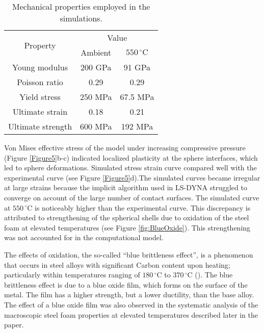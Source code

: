 \documentclass[review]{elsarticle}
\begin{document}
{%
\begin{table}[htbp]
	\centering
	\caption{Mechanical properties employed in the simulations.}
	\begin{tabular}{ccc}
		\toprule
		\multirow{2}[0]{*}{Property} & \multicolumn{2}{c}{Value} \\
		& Ambient & $550\,^{\circ}\mathrm{C}$ \\
		\midrule
		Young modulus & 200 GPa & 91 GPa \\
		Poisson ratio & 0.29  & 0.29 \\
		Yield stress & 250 MPa & 67.5 MPa \\
		Ultimate strain & 0.18  & 0.21 \\
		Ultimate strength & 600 MPa & 192 MPa \\
		\bottomrule
	\end{tabular}%
	\label{Tab2}%
\end{table}%

Von Mises effective stress of the model under increasing compressive pressure (Figure \ref{Figure5}b-c) indicated localized plasticity at the sphere interfaces, which led to sphere deformations. Simulated stress strain curve compared well with the experimental curve (see Figure \ref{Figure5}d).The simulated curves became irregular at large strains because the implicit algorithm used in LS-DYNA struggled to converge on account of the large number of contact surfaces. The simulated curve at $550\,^{\circ}\mathrm{C}$ is noticeably higher than the experimental curve. This discrepancy is attributed to strengthening of the spherical shells due to oxidation of the steel foam at elevated temperatures (see Figure \ref{fig:BlueOxide}). This strengthening was not accounted for in the computational model.


The effects of oxidation, the so-called “blue brittleness effect”, is a phenomenon that occurs in steel alloys with significant Carbon content upon heating; particularly within temperatures ranging of $180\,^{\circ}\mathrm{C}$ to $370\,^{\circ}\mathrm{C}$ (\cite{XiongandLiew2016}). The blue brittleness effect is due to a blue oxide film, which forms on the surface of the metal. The film has a higher strength, but a lower ductility, than the base alloy. The effect of a blue oxide film was also observed in the systematic analysis of the macroscopic steel foam properties at elevated temperatures described later in the paper.


}
\end{document}
